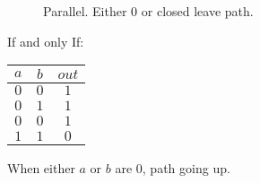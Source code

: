 \documentclass[a4paper,12pt]{article}
\begin{document}
\begin{figure}[hbt] 
\centering 



\label{NAND Gate} 

\end{figure} 

\begin{figure}


\caption{Parallel. Either $0$ or closed leave path.}

\end{figure}

If and only If:

\begin{tabular}{|c|c|c|}
\hline
$a$	&	$b$	&	$out$	\\
\hline
$0$	&	$0$	&	$1$	\\
\hline
$0$	&	$1$	&	$1$	\\
\hline
$0$	&	$0$	&	$1$	\\
\hline
$1$	&	$1$	&	$0$	\\
\hline
\end{tabular}

When either $a$ or $b$ are $0$, path going up.
\end{document}
